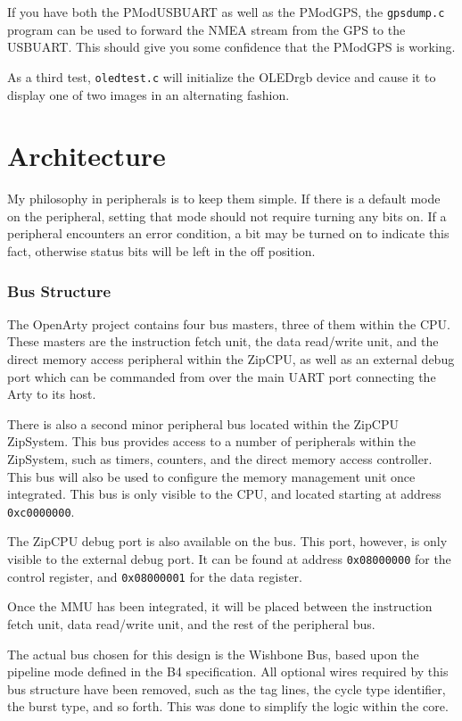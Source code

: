 \documentclass{gqtekspec}
\begin{document}
If you have both the PModUSBUART as well as the PModGPS, the {\tt gpsdump.c}
program can be used to forward the NMEA stream from the GPS to the USBUART. 
This should give you some confidence that the PModGPS is working.

As a third test, {\tt oledtest.c} will initialize the OLEDrgb device and cause
it to display one of two images in an alternating fashion.

\chapter{Architecture}\label{ch:architecture}
My philosophy in peripherals is to keep them simple.  If there is a default
mode on the peripheral, setting that mode should not require turning any bits
on.  If a peripheral encounters an error condition, a bit may be turned on to
indicate this fact, otherwise status bits will be left in the off position.

\subsection{Bus Structure}
The OpenArty project contains four bus masters, three of them within the CPU.
These masters are the instruction fetch unit, the data read/write unit,
and the direct memory access peripheral within the ZipCPU, as well as an 
external debug port which can be commanded from over the main UART port
connecting the Arty to its host.  

There is also a second minor peripheral bus located within the ZipCPU
ZipSystem.  This bus provides access to a number of peripherals within the
ZipSystem, such as timers, counters, and the direct memory access controller.
This bus will also be used to configure the memory management unit once
integrated.  This bus is only visible to the CPU, and located starting at
address {\tt 0xc0000000}.

The ZipCPU debug port is also available on the bus.  This port, however, is
only visible to the external debug port.  It can be found at address
{\tt 0x08000000} for the control register, and {\tt 0x08000001} for the
data register.

Once the MMU has been integrated, it will be placed between the instruction
fetch unit, data read/write unit, and the rest of the peripheral bus.

The actual bus chosen for this design is the Wishbone Bus, based upon the
pipeline mode defined in the B4 specification.  All optional wires required
by this bus structure have been removed, such as the tag lines, the cycle
type identifier, the burst type, and so forth.  This was done to simplify
the logic within the core.
\end{document}
